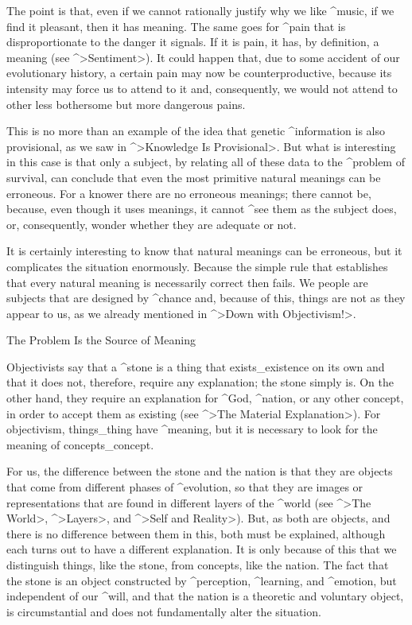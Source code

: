 The point is that, even if we cannot rationally justify why we like
^{music}, if we find it pleasant, then it has meaning. The same goes for
^{pain} that is disproportionate to the danger it signals. If it is
pain, it has, by definition, a meaning (see ^>Sentiment>). It could
happen that, due to some accident of our evolutionary history, a certain
pain may now be counterproductive, because its intensity may force us to
attend to it and, consequently, we would not attend to other less
bothersome but more dangerous pains.

This is no more than an example of the idea that genetic ^{information}
is also provisional, as we saw in ^>Knowledge Is Provisional>. But what
is interesting in this case is that only a subject, by relating all of
these data to the ^{problem of survival}, can conclude that even the
most primitive natural meanings can be erroneous. For a knower there are
no erroneous meanings; there cannot be, because, even though it uses
meanings, it cannot ^{see} them as the subject does, or, consequently,
wonder whether they are adequate or not.

It is certainly interesting to know that natural meanings can be
erroneous, but it complicates the situation enormously. Because the
simple rule that establishes that every natural meaning is necessarily
correct then fails. We people are subjects that are designed by
^{chance} and, because of this, things are not as they appear to us, as
we already mentioned in ^>Down with Objectivism!>.


\Section The Problem Is the Source of Meaning

Objectivists say that a ^{stone} is a thing that exists_{existence} on
its own and that it does not, therefore, require any explanation; the
stone simply is. On the other hand, they require an explanation for
^{God}, ^{nation}, or any other concept, in order to accept them as
existing (see ^>The Material Explanation>). For objectivism,
things_{thing} have ^{meaning}, but it is necessary to look for the
meaning of concepts_{concept}.

For us, the difference between the stone and the nation is that they are
objects that come from different phases of ^{evolution}, so that they
are images or representations that are found in different layers of the
^{world} (see ^>The World>, ^>Layers>, and ^>Self and Reality>). But, as
both are objects, and there is no difference between them in this, both
must be explained, although each turns out to have a different
explanation. It is only because of this that we distinguish things, like
the stone, from concepts, like the nation. The fact that the stone is an
object constructed by ^{perception}, ^{learning}, and ^{emotion}, but
independent of our ^{will}, and that the nation is a theoretic and
voluntary object, is circumstantial and does not fundamentally alter the
situation.


